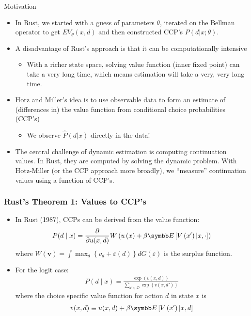 \documentclass[aspectratio=169,11pt]{beamer}
\begin{document}
\begin{frame}{Motivation}
\begin{itemize}
	\item In Rust, we started with a guess of parameters $\theta$, iterated on the Bellman operator to get $EV_{\theta}(x,d)$ and then constructed CCP's $P(d | x;\theta)$.
	\item A disadvantage of Rust's approach is that it can be computationally intensive
	\begin{itemize}
		\item With a richer state space, solving value function (inner fixed point)
		can take a very long time,
		which means estimation will take a very, very long time.
	\end{itemize}
	\item Hotz and Miller's idea is to use observable data to form an estimate
	of (differences in) the value function from conditional choice probabilities (CCP's)
\begin{itemize}
\item We observe $\hat{P}(d | x)$ directly in the data!
\end{itemize}
	\item The central challenge of dynamic estimation is computing continuation values.
	In Rust, they are computed by solving the dynamic problem.
	With Hotz-Miller (or the CCP approach more broadly), we ``measure'' continuation
	values using a function of CCP's.

\end{itemize}
\end{frame}

\begin{frame}
\frametitle{Rust's Theorem 1: Values to CCP's}
\begin{itemize}
	\item In Rust (1987), CCPs can be derived from the value function:
	\begin{align*}
		P(d \mid x) = \frac{\partial}{\partial u(x,d)} W\left( u\left( x \right)
		+\beta \E\left[V\left(x' \right)|x,\cdot\right]\right)
	\end{align*}
	where
	$W\left(\symbf{v}\right) = \int \max_{d} \left\{ v_{d} +\varepsilon(d)\right\}dG\left( \varepsilon\right)$
	is the surplus function.
	\medskip
	\item For the logit case:
	\begin{align*}
	P(d \mid x) = \frac{\exp\left(v(x,d)\right)}{\sum_{d'\in \mathcal{D}}\exp\left(v(x,d')\right)}
	\end{align*}
	where the choice specific value function for action $d$ in state $x$ is
	\begin{align*}
	v(x,d) \equiv u(x,d)+\beta \E\left[V\left(x' \right)|x,d\right]
	\end{align*}
\end{itemize}
\end{frame}
\end{document}
